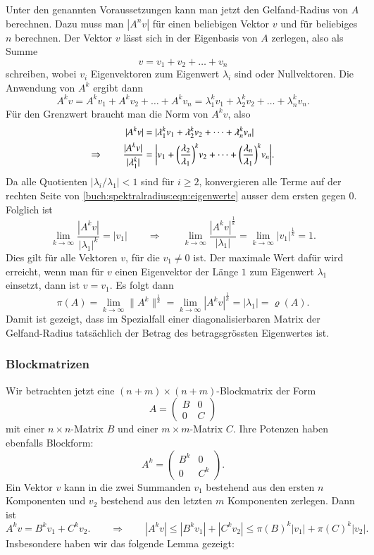 Unter den genannten Voraussetzungen kann man jetzt den Gelfand-Radius
von $A$ berechnen.
Dazu muss man $|A^nv|$ für einen beliebigen Vektor $v$ und für
beliebiges $n$ berechnen.
Der Vektor $v$ lässt sich in der Eigenbasis von $A$ zerlegen, also
als Summe
%
\[
v = v_1+v_2+\dots+v_n
\]
schreiben, wobei $v_i$ Eigenvektoren zum Eigenwert $\lambda_i$ sind oder
Nullvektoren.
Die Anwendung von $A^k$ ergibt dann
\[
A^k v
=
A^k v_1 + A^k v_2 + \dots + A^k v_n
=
\lambda_1^k v_1 + \lambda_2^k v_2 + \dots + \lambda_n^k v_n.
\]
Für den Grenzwert braucht man die Norm von $A^kv$, also
\begin{align}
|A^kv|
&= |\lambda_1^k v_1 + \lambda_2^k v_2 + \dots + \lambda_n^k v_n|
\notag
\\
\Rightarrow\qquad
\frac{|A^kv|}{|\lambda_1^k|}
&=
\biggl|
v_1 +
\biggl(\frac{\lambda_2}{\lambda_1}\biggr)^k v_2
+
\dots
+
\biggl(\frac{\lambda_n}{\lambda_1}\biggr)^k v_n
\biggr|.
\label{buch:spektralradius:eqn:eigenwerte}
\end{align}
Da alle Quotienten $|\lambda_i/\lambda_1|<1$ sind für $i\ge 2$,
konvergieren alle Terme auf der rechten Seite von
\eqref{buch:spektralradius:eqn:eigenwerte}
ausser dem ersten gegen $0$.
Folglich ist
\[
\lim_{k\to\infty} \frac{|A^kv|}{|\lambda_1|^k}
=
|v_1|
\qquad\Rightarrow\qquad
\lim_{k\to\infty} \frac{|A^kv|^\frac1k}{|\lambda_1|}
=
\lim_{k\to\infty}|v_1|^{\frac1k}
=
1.
\]
Dies gilt für alle Vektoren $v$, für die $v_1\ne 0$ ist.
Der maximale Wert dafür wird erreicht, wenn man für 
$v$ einen Eigenvektor der Länge $1$ zum Eigenwert $\lambda_1$ einsetzt,
dann ist $v=v_1$.
Es folgt dann
\[
\pi(A)
=
\lim_{k\to\infty} \| A^k\|^\frac1k
=
\lim_{k\to\infty} |A^kv|^\frac1k
=
|\lambda_1|
=
\varrho(A).
\]
Damit ist gezeigt, dass im Spezialfall einer diagonalisierbaren Matrix der
Gelfand-Radius tatsächlich der Betrag des betragsgrössten Eigenwertes ist.
%

\subsubsection{Blockmatrizen}
Wir betrachten jetzt eine $(n+m)\times(n+m)$-Blockmatrix der Form
\begin{equation}
A = \begin{pmatrix} B & 0 \\ 0 & C\end{pmatrix}
\label{buch:spektralradius:eqn:blockmatrix}
\end{equation}
mit einer $n\times n$-Matrix $B$ und einer $m\times m$-Matrix $C$.
Ihre Potenzen haben ebenfalls Blockform:
\[
A^k = \begin{pmatrix} B^k & 0 \\ 0 & C^k\end{pmatrix}.
\]
Ein Vektor $v$ kann in die zwei Summanden $v_1$ bestehend aus den
ersten $n$ Komponenten und $v_2$ bestehend aus den letzten $m$ 
Komponenten zerlegen.
Dann ist
\[
A^kv = B^kv_1 + C^kv_2.
\qquad\Rightarrow\qquad
|A^kv|
\le
|B^kv_1| + |C^kv_2|
\le 
\pi(B)^k |v_1| + \pi(C)^k |v_2|.
\]
Insbesondere haben wir das folgende Lemma gezeigt:

